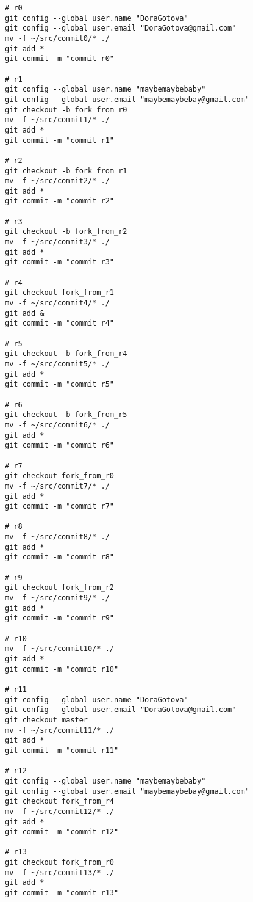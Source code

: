 
\tiny
\begin{verbatim}
# r0
git config --global user.name "DoraGotova"
git config --global user.email "DoraGotova@gmail.com"
mv -f ~/src/commit0/* ./
git add *
git commit -m "commit r0"

# r1
git config --global user.name "maybemaybebaby"
git config --global user.email "maybemaybebay@gmail.com"
git checkout -b fork_from_r0
mv -f ~/src/commit1/* ./
git add *
git commit -m "commit r1"

# r2
git checkout -b fork_from_r1
mv -f ~/src/commit2/* ./
git add *
git commit -m "commit r2"

# r3
git checkout -b fork_from_r2
mv -f ~/src/commit3/* ./
git add *
git commit -m "commit r3"

# r4
git checkout fork_from_r1
mv -f ~/src/commit4/* ./
git add &
git commit -m "commit r4"

# r5
git checkout -b fork_from_r4
mv -f ~/src/commit5/* ./
git add *
git commit -m "commit r5"

# r6
git checkout -b fork_from_r5
mv -f ~/src/commit6/* ./
git add *
git commit -m "commit r6"

# r7
git checkout fork_from_r0
mv -f ~/src/commit7/* ./
git add *
git commit -m "commit r7"

# r8
mv -f ~/src/commit8/* ./
git add *
git commit -m "commit r8"

# r9
git checkout fork_from_r2
mv -f ~/src/commit9/* ./
git add *
git commit -m "commit r9"

# r10
mv -f ~/src/commit10/* ./
git add *
git commit -m "commit r10"

# r11
git config --global user.name "DoraGotova"
git config --global user.email "DoraGotova@gmail.com"
git checkout master
mv -f ~/src/commit11/* ./
git add *
git commit -m "commit r11"

# r12
git config --global user.name "maybemaybebaby"
git config --global user.email "maybemaybebay@gmail.com"
git checkout fork_from_r4
mv -f ~/src/commit12/* ./
git add *
git commit -m "commit r12"

# r13
git checkout fork_from_r0
mv -f ~/src/commit13/* ./
git add *
git commit -m "commit r13"
\end{verbatim}
\normalsize
\newpage

